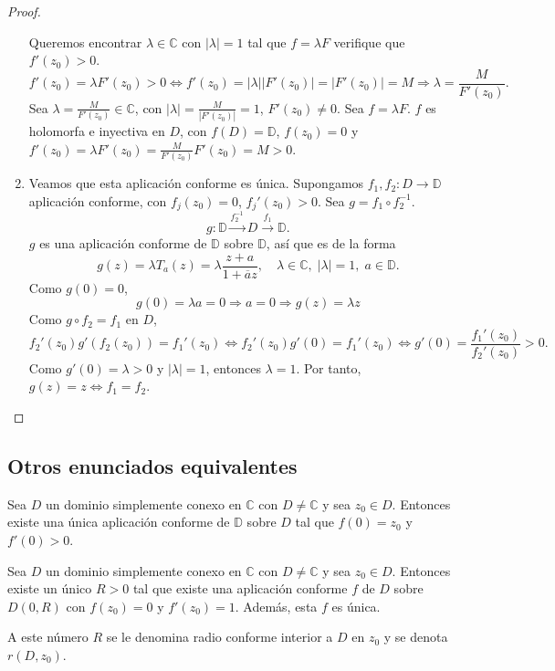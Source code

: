 \begin{proof}
\begin{enumerate}
              Queremos encontrar $\lambda \in \mathbb{C}$ con $|\lambda| = 1$ tal que $f = \lambda F$ verifique que $f'(z_0) > 0$.
              $$f'(z_0) = \lambda F'(z_0) > 0 \Leftrightarrow f'(z_0) = |\lambda||F'(z_0)| = |F'(z_0)| = M \Rightarrow \lambda = \frac{M}{F'(z_0)}.$$
              Sea $\lambda = \frac{M}{F'(z_0)} \in \mathbb{C}$, con $|\lambda| = \frac{M}{|F'(z_0)|} = 1$, $F'(z_0) \neq 0$.
              Sea $f = \lambda F$.
              $f$ es holomorfa e inyectiva en $D$, con $f(D) = \mathbb{D}$, $f(z_0) = 0$ y $f'(z_0) = \lambda F'(z_0) = \frac{M}{F'(z_0)}F'(z_0) = M > 0$.

        \item Veamos que esta aplicación conforme es única.
              Supongamos $f_1, f_2: D \to \mathbb{D}$ aplicación conforme, con $f_j(z_0) = 0$, $f_j'(z_0) > 0$.
              Sea $g = f_1 \circ f_2^{-1}$.
              $$g: \mathbb{D} \xrightarrow{f_2^{-1}} D \xrightarrow{f_1} \mathbb{D}.$$
              $g$ es una aplicación conforme de $\mathbb{D}$ sobre $\mathbb{D}$, así que es de la forma
              $$g(z) = \lambda T_a(z) = \lambda \frac{z+a}{1+\overline{a}z}, \quad \lambda \in \mathbb{C}, \; |\lambda| = 1, \; a \in \mathbb{D}.$$
              Como $g(0) = 0$,
              $$g(0) = \lambda a = 0 \Rightarrow a = 0 \Rightarrow g(z) = \lambda z$$
              Como $g \circ f_2 = f_1$ en $D$,
              $$f_2'(z_0)g'(f_2(z_0)) = f_1'(z_0) \Leftrightarrow f_2'(z_0)g'(0) = f_1'(z_0) \Leftrightarrow g'(0) = \frac{f_1'(z_0)}{f_2'(z_0)} > 0.$$
              Como $g'(0) = \lambda > 0$ y $|\lambda| = 1$, entonces $\lambda = 1$.
              Por tanto, $g(z) = z \Leftrightarrow f_1 = f_2$.
    \end{enumerate}
\end{proof}

\subsection*{Otros enunciados equivalentes}
\begin{theorem}
    Sea $D$ un dominio simplemente conexo en $\mathbb{C}$ con $D \neq \mathbb{C}$ y sea $z_0 \in D$.
    Entonces existe una única aplicación conforme de $\mathbb{D}$ sobre $D$ tal que $f(0) = z_0$ y $f'(0) > 0$.
\end{theorem}


\begin{theorem}
    Sea $D$ un dominio simplemente conexo en $\mathbb{C}$ con $D \neq \mathbb{C}$ y sea $z_0 \in D$.
    Entonces existe un único $R > 0$ tal que existe una aplicación conforme $f$ de $D$ sobre $D(0, R)$ con $f(z_0) = 0$ y $f'(z_0) = 1$.
    Además, esta $f$ es única.

    A este número $R$ se le denomina radio conforme interior a $D$ en $z_0$ y se denota $r(D, z_0)$.
\end{theorem}


